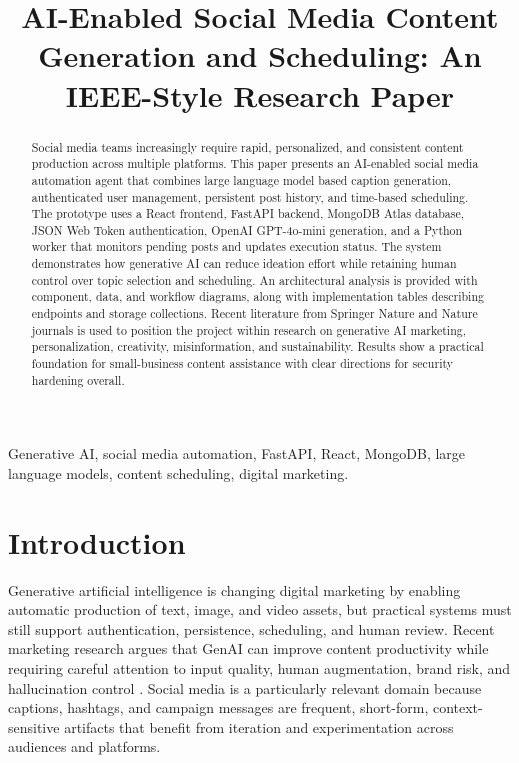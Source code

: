 \documentclass[conference]{IEEEtran}
\title{AI-Enabled Social Media Content Generation and Scheduling: An IEEE-Style Research Paper}
\author{
\IEEEauthorblockN{Abhi}
\IEEEauthorblockA{
Department of Computer Science and Engineering\\
Project: AI Social Media Automation Agent
}
}
\begin{document}
\maketitle

\begin{abstract}
Social media teams increasingly require rapid, personalized, and consistent content production across multiple platforms. This paper presents an AI-enabled social media automation agent that combines large language model based caption generation, authenticated user management, persistent post history, and time-based scheduling. The prototype uses a React frontend, FastAPI backend, MongoDB Atlas database, JSON Web Token authentication, OpenAI GPT-4o-mini generation, and a Python worker that monitors pending posts and updates execution status. The system demonstrates how generative AI can reduce ideation effort while retaining human control over topic selection and scheduling. An architectural analysis is provided with component, data, and workflow diagrams, along with implementation tables describing endpoints and storage collections. Recent literature from Springer Nature and Nature journals is used to position the project within research on generative AI marketing, personalization, creativity, misinformation, and sustainability. Results show a practical foundation for small-business content assistance with clear directions for security hardening overall.
\end{abstract}

\begin{IEEEkeywords}
Generative AI, social media automation, FastAPI, React, MongoDB, large language models, content scheduling, digital marketing.
\end{IEEEkeywords}

\section{Introduction}

Generative artificial intelligence is changing digital marketing by enabling automatic production of text, image, and video assets, but practical systems must still support authentication, persistence, scheduling, and human review. Recent marketing research argues that GenAI can improve content productivity while requiring careful attention to input quality, human augmentation, brand risk, and hallucination control \cite{grewal2025,cillo2025}. Social media is a particularly relevant domain because captions, hashtags, and campaign messages are frequent, short-form, context-sensitive artifacts that benefit from iteration and experimentation across audiences and platforms.
\end{document}
